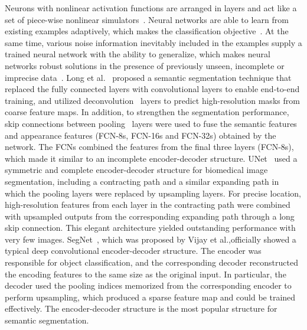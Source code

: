 \documentclass[10pt,twocolumn,letterpaper]{article}
\begin{document}
Neurons with nonlinear activation functions are arranged in layers and act like a set of piece-wise nonlinear simulators~\cite{neurApproximators}. Neural networks are able to learn from existing examples adaptively, which makes the classification objective~\cite{classificationObjective}. At the same time, various noise information inevitably included in the examples supply a trained neural network with the ability to generalize, which makes neural networks robust solutions in the presence of previously unseen, incomplete or imprecise data~\cite{impreciseData}.
 Long et al.~\cite{long} proposed a semantic segmentation technique that replaced the fully connected layers with convolutional layers to enable end-to-end training, and utilized deconvolution~\cite{deconvolutional} layers to predict high-resolution masks from coarse feature maps. In addition, to strengthen the segmentation performance, skip connections between pooling~\cite{gradientBased} layers were used to fuse the semantic features and appearance features (FCN-8s, FCN-16s and FCN-32s) obtained by the network. The FCNs combined the features from the final three layers (FCN-8s), which made it similar to an incomplete encoder-decoder structure. UNet~\cite{unet} used a symmetric and complete encoder-decoder structure for biomedical image segmentation, including a contracting path and a similar expanding path in which the pooling layers were replaced by upsampling layers. For precise location, high-resolution features from each layer in the contracting path were combined with upsampled outputs from the corresponding expanding path through a long skip connection. This elegant architecture yielded outstanding performance with very few images. SegNet~\cite{segnet}, which was proposed by Vijay et al.,officially showed a typical deep convolutional encoder-decoder structure. The encoder was responsible for object classification, and the corresponding decoder reconstructed the encoding features to the same size as the original input. In particular, the decoder used the pooling indices memorized from the corresponding encoder to perform upsampling, which produced a sparse feature map and could be trained effectively. The encoder-decoder structure is the most popular structure for semantic segmentation.
 
\end{document}
